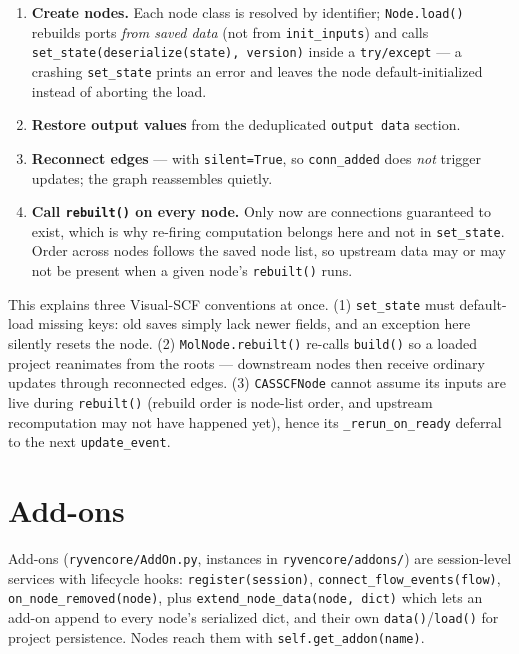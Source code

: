 \documentclass[10pt,a4paper]{article}
\newcommand{\code}[1]{\texttt{\small #1}}
\begin{document}
\begin{enumerate}[itemsep=1pt]
\item \textbf{Create nodes.} Each node class is resolved by identifier;
      \code{Node.load()} rebuilds ports \emph{from saved data} (not from
      \code{init\_inputs}) and calls
      \code{set\_state(deserialize(state), version)} inside a \code{try/except} ---
      a crashing \code{set\_state} prints an error and leaves the node
      default-initialized instead of aborting the load.
\item \textbf{Restore output values} from the deduplicated \code{output data} section.
\item \textbf{Reconnect edges} --- with \code{silent=True}, so
      \code{conn\_added} does \emph{not} trigger updates; the graph reassembles
      quietly.
\item \textbf{Call \code{rebuilt()} on every node.} Only now are connections
      guaranteed to exist, which is why re-firing computation belongs here and not in
      \code{set\_state}. Order across nodes follows the saved node list, so upstream
      data may or may not be present when a given node's \code{rebuilt()} runs.
\end{enumerate}

\begin{scfnote}
This explains three Visual-SCF conventions at once. (1) \code{set\_state} must
default-load missing keys: old saves simply lack newer fields, and an exception here
silently resets the node. (2) \code{MolNode.rebuilt()} re-calls \code{build()} so a
loaded project reanimates from the roots --- downstream nodes then receive ordinary
updates through reconnected edges. (3) \code{CASSCFNode} cannot assume its inputs are
live during \code{rebuilt()} (rebuild order is node-list order, and upstream
recomputation may not have happened yet), hence its \code{\_rerun\_on\_ready} deferral
to the next \code{update\_event}.
\end{scfnote}

\section{Add-ons}

Add-ons (\code{ryvencore/AddOn.py}, instances in \code{ryvencore/addons/}) are
session-level services with lifecycle hooks: \code{register(session)},
\code{connect\_flow\_events(flow)}, \code{on\_node\_removed(node)}, plus
\code{extend\_node\_data(node, dict)} which lets an add-on append to every node's
serialized dict, and their own \code{data()}/\code{load()} for project persistence.
Nodes reach them with \code{self.get\_addon(name)}.
\end{document}
